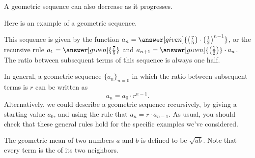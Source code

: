 \documentclass{ximera}
\begin{document}
A geometric sequence can also decrease as it progresses.

\begin{example}
  Here is an example of a geometric sequence.
  \begin{image}
  \end{image}
  This sequence is given by the function $a_n=\answer[given]{\left(\frac{7}{5}\right)\cdot
    \left(\frac{1}{2}\right)^{n-1}}$, or the recursive rule $a_1 = \answer[given]{\frac{7}{5}}$ and
  $a_{n+1} = \answer[given]{\left(\frac{1}{2}\right)}\cdot a_n$. The ratio between subsequent terms 
  of this sequence is always one half.
\end{example}

In general, a geometric sequence $\{a_n\}_{n=0}$ in which the ratio between
subsequent terms is $r$ can be written as
\[
a_n = a_0 \cdot r^{n-1}.
\]
Alternatively, we could describe a geometric sequence
recursively, by giving a starting value $a_0$, and using the rule that
$a_{n} = r \cdot a_{n-1}$.  As usual, you should check that these general 
rules hold for the specific examples we've considered.

\begin{remark}
The
geometric mean of two numbers $a$ and $b$ is defined to be
$\sqrt{ab}$. Note that every term is the  of its two neighbors.   

\end{remark}
%
\end{document}
